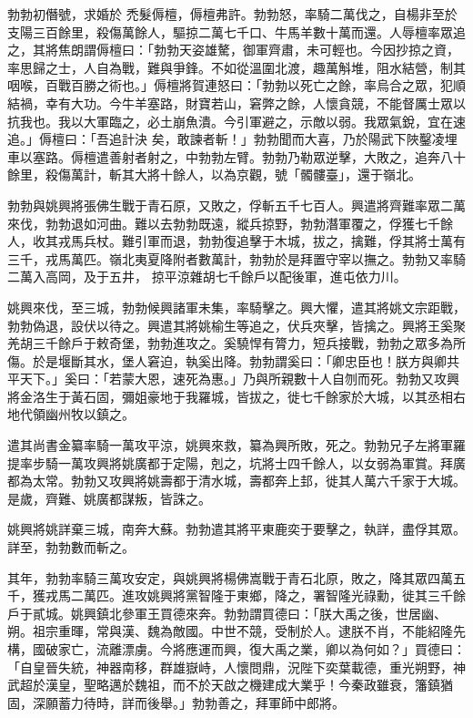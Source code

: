 \begin{pinyinscope}
 勃勃初僭號，求婚於
 禿髮傉檀，傉檀弗許。勃勃怒，率騎二萬伐之，自楊非至於支陽三百餘里，殺傷萬餘人，驅掠二萬七千口、牛馬羊數十萬而還。人辱檀率眾追之，其將焦朗謂傉檀曰：「勃勃天姿雄驁，御軍齊肅，未可輕也。今因抄掠之資，率思歸之士，人自為戰，難與爭鋒。不如從溫圍北渡，趣萬斛堆，阻水結營，制其咽喉，百戰百勝之術也。」傉檀將賀連怒曰：「勃勃以死亡之餘，率烏合之眾，犯順結禍，幸有大功。今牛羊塞路，財寶若山，窘弊之餘，人懷貪競，不能督厲士眾以抗我也。我以大軍臨之，必土崩魚潰。今引軍避之，示敵以弱。我眾氣銳，宜在速追。」傉檀曰：「吾追計決
 矣，敢諫者斬！」勃勃聞而大喜，乃於陽武下陜鑿凌埋車以塞路。傉檀遣善射者射之，中勃勃左臂。勃勃乃勒眾逆擊，大敗之，追奔八十餘里，殺傷萬計，斬其大將十餘人，以為京觀，號「髑髏臺」，還于嶺北。



 勃勃與姚興將張佛生戰于青石原，又敗之，俘斬五千七百人。興遣將齊難率眾二萬來伐，勃勃退如河曲。難以去勃勃既遠，縱兵掠野，勃勃潛軍覆之，俘獲七千餘人，收其戎馬兵杖。難引軍而退，勃勃復追擊于木城，拔之，擒難，俘其將士萬有三千，戎馬萬匹。嶺北夷夏降附者數萬計，勃勃於是拜置守宰以撫之。勃勃又率騎二萬入高岡，及于五井，
 掠平涼雜胡七千餘戶以配後軍，進屯依力川。



 姚興來伐，至三城，勃勃候興諸軍未集，率騎擊之。興大懼，遣其將姚文宗距戰，勃勃偽退，設伏以待之。興遣其將姚榆生等追之，伏兵夾擊，皆擒之。興將王奚聚羌胡三千餘戶于敕奇堡，勃勃進攻之。奚驍悍有膂力，短兵接戰，勃勃之眾多為所傷。於是堰斷其水，堡人窘迫，執奚出降。勃勃謂奚曰：「卿忠臣也！朕方與卿共平天下。」奚曰：「若蒙大恩，速死為惠。」乃與所親數十人自刎而死。勃勃又攻興將金洛生于黃石固，彌姐豪地于我羅城，皆拔之，徙七千餘家於大城，以其丞相右地代領幽州牧以鎮之。



 遣其尚書金纂率騎一萬攻平涼，姚興來救，纂為興所敗，死之。勃勃兄子左將軍羅提率步騎一萬攻興將姚廣都于定陽，剋之，坑將士四千餘人，以女弱為軍賞。拜廣都為太常。勃勃又攻興將姚壽都于清水城，壽都奔上邽，徙其人萬六千家于大城。是歲，齊難、姚廣都謀叛，皆誅之。



 姚興將姚詳棄三城，南奔大蘇。勃勃遣其將平東鹿奕于要擊之，執詳，盡俘其眾。詳至，勃勃數而斬之。



 其年，勃勃率騎三萬攻安定，與姚興將楊佛嵩戰于青石北原，敗之，降其眾四萬五千，獲戎馬二萬匹。進攻姚興將黨智隆于東鄉，降之，署智隆光祿勳，徙其三千餘
 戶于貳城。姚興鎮北參軍王買德來奔。勃勃謂買德曰：「朕大禹之後，世居幽、朔。祖宗重暉，常與漢、魏為敵國。中世不競，受制於人。逮朕不肖，不能紹隆先構，國破家亡，流離漂虜。今將應運而興，復大禹之業，卿以為何如？」買德曰：「自皇晉失統，神器南移，群雄嶽峙，人懷問鼎，況陛下奕葉載德，重光朔野，神武超於漢皇，聖略邁於魏祖，而不於天啟之機建成大業乎！今秦政雖衰，籓鎮猶固，深願蓄力待時，詳而後舉。」勃勃善之，拜軍師中郎將。




\end{pinyinscope}
